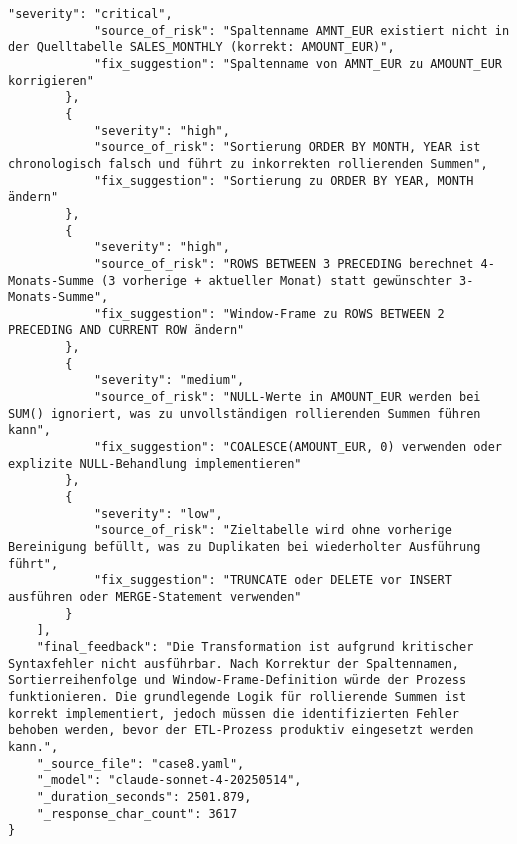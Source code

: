 \begin{lstlisting}[caption={Ausgabe: Claude Sonnet 4 Anwendungsfall 8 Robustheitsdurchlauf},label={claude_case8_prompt3}]
            "severity": "critical",
            "source_of_risk": "Spaltenname AMNT_EUR existiert nicht in der Quelltabelle SALES_MONTHLY (korrekt: AMOUNT_EUR)",
            "fix_suggestion": "Spaltenname von AMNT_EUR zu AMOUNT_EUR korrigieren"
        },
        {
            "severity": "high",
            "source_of_risk": "Sortierung ORDER BY MONTH, YEAR ist chronologisch falsch und führt zu inkorrekten rollierenden Summen",
            "fix_suggestion": "Sortierung zu ORDER BY YEAR, MONTH ändern"
        },
        {
            "severity": "high",
            "source_of_risk": "ROWS BETWEEN 3 PRECEDING berechnet 4-Monats-Summe (3 vorherige + aktueller Monat) statt gewünschter 3-Monats-Summe",
            "fix_suggestion": "Window-Frame zu ROWS BETWEEN 2 PRECEDING AND CURRENT ROW ändern"
        },
        {
            "severity": "medium",
            "source_of_risk": "NULL-Werte in AMOUNT_EUR werden bei SUM() ignoriert, was zu unvollständigen rollierenden Summen führen kann",
            "fix_suggestion": "COALESCE(AMOUNT_EUR, 0) verwenden oder explizite NULL-Behandlung implementieren"
        },
        {
            "severity": "low",
            "source_of_risk": "Zieltabelle wird ohne vorherige Bereinigung befüllt, was zu Duplikaten bei wiederholter Ausführung führt",
            "fix_suggestion": "TRUNCATE oder DELETE vor INSERT ausführen oder MERGE-Statement verwenden"
        }
    ],
    "final_feedback": "Die Transformation ist aufgrund kritischer Syntaxfehler nicht ausführbar. Nach Korrektur der Spaltennamen, Sortierreihenfolge und Window-Frame-Definition würde der Prozess funktionieren. Die grundlegende Logik für rollierende Summen ist korrekt implementiert, jedoch müssen die identifizierten Fehler behoben werden, bevor der ETL-Prozess produktiv eingesetzt werden kann.",
    "_source_file": "case8.yaml",
    "_model": "claude-sonnet-4-20250514",
    "_duration_seconds": 2501.879,
    "_response_char_count": 3617
}
\end{lstlisting}

